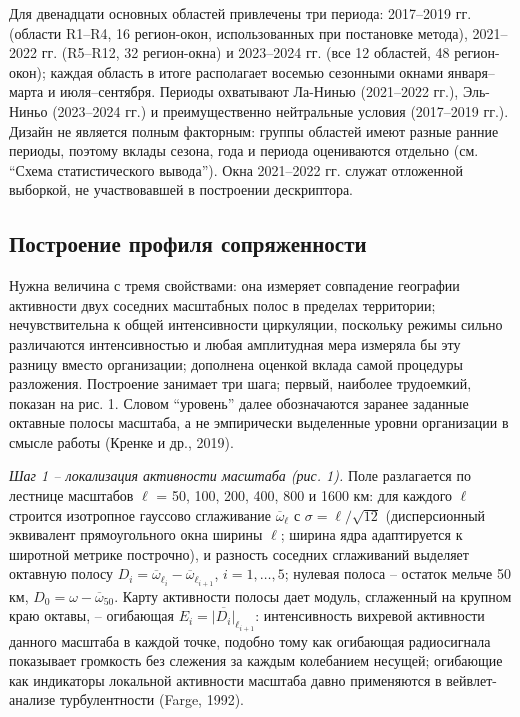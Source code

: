 \documentclass[12pt,a4paper]{article}
\begin{document}
Для двенадцати основных областей привлечены три периода: 2017--2019 гг. (области R1--R4, 16 регион-окон, использованных при постановке метода), 2021--2022 гг. (R5--R12, 32 регион-окна) и 2023--2024 гг. (все 12 областей, 48 регион-окон); каждая область в итоге располагает восемью сезонными окнами января--марта и июля--сентября. Периоды охватывают Ла-Нинью (2021--2022 гг.), Эль-Ниньо (2023--2024 гг.) и преимущественно нейтральные условия (2017--2019 гг.). Дизайн не является полным факторным: группы областей имеют разные ранние периоды, поэтому вклады сезона, года и периода оцениваются отдельно (см. “Схема статистического вывода”). Окна 2021--2022 гг. служат отложенной выборкой, не участвовавшей в построении дескриптора.

\subsection{Построение профиля сопряженности}

Нужна величина с тремя свойствами: она измеряет совпадение географии активности двух соседних масштабных полос в пределах территории; нечувствительна к общей интенсивности циркуляции, поскольку режимы сильно различаются интенсивностью и любая амплитудная мера измеряла бы эту разницу вместо организации; дополнена оценкой вклада самой процедуры разложения. Построение занимает три шага; первый, наиболее трудоемкий, показан на рис. 1. Словом “уровень” далее обозначаются заранее заданные октавные полосы масштаба, а не эмпирически выделенные уровни организации в смысле работы (Кренке и др., 2019).

\emph{Шаг 1 -- локализация активности масштаба (рис. 1).} Поле разлагается по лестнице масштабов $\ell$ = 50, 100, 200, 400, 800 и 1600 км: для каждого $\ell$ строится изотропное гауссово сглаживание $\overline{\omega}_\ell$ с $\sigma = \ell/\sqrt{12}$ (дисперсионный эквивалент прямоугольного окна ширины $\ell$; ширина ядра адаптируется к широтной метрике построчно), и разность соседних сглаживаний выделяет октавную полосу $D_i = \overline{\omega}_{\ell_i} - \overline{\omega}_{\ell_{i+1}}$, $i = 1, \dots, 5$; нулевая полоса -- остаток мельче 50 км, $D_0 = \omega - \overline{\omega}_{50}$. Карту активности полосы дает модуль, сглаженный на крупном краю октавы, -- огибающая $E_i = \overline{|D_i|}_{\ell_{i+1}}$: интенсивность вихревой активности данного масштаба в каждой точке, подобно тому как огибающая радиосигнала показывает громкость без слежения за каждым колебанием несущей; огибающие как индикаторы локальной активности масштаба давно применяются в вейвлет-анализе турбулентности (Farge, 1992).
\end{document}
